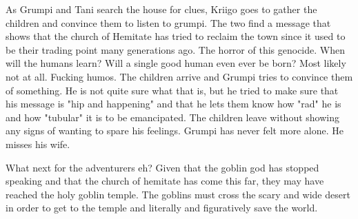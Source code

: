 As Grumpi and Tani search the house for clues, Kriigo goes to gather the children and convince them to listen to grumpi. The two find a message that shows that the church of Hemitate has tried to reclaim the town since it used to be their trading point many generations ago. The horror of this genocide. When will the humans learn? Will a single good human even ever be born? Most likely not at all. Fucking humos. The children arrive and Grumpi tries to convince them of something. He is not quite sure what that is, but he tried to make sure that his message is "hip and happening" and that he lets them know how "rad" he is and how "tubular" it is to be emancipated. The children leave without showing any signs of wanting to spare his feelings. Grumpi has never felt more alone. He misses his wife.\medskip

What next for the adventurers eh? Given that the goblin god has stopped speaking and that the church of hemitate has come this far, they may have reached the holy goblin temple. The goblins must cross the scary and wide desert in order to get to the temple and literally and figuratively save the world.